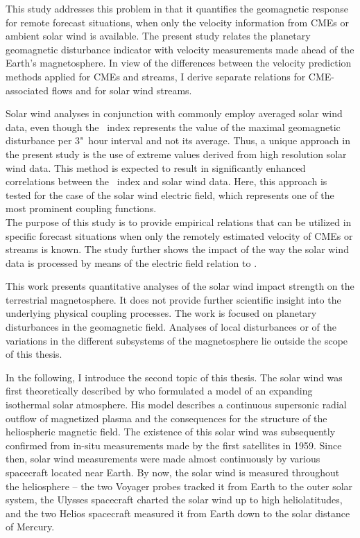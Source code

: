 This study addresses this problem in that it quantifies the geomagnetic response for remote forecast situations, when only the velocity information from CMEs or ambient solar wind is available.
The present study relates the planetary geomagnetic disturbance indicator \Kp{} with velocity measurements made ahead of the Earth's magnetosphere. In view of the differences between the velocity prediction methods applied for CMEs and streams, I derive separate relations for CME-associated flows and for solar wind streams.

Solar wind analyses in conjunction with \Kp{} commonly employ averaged solar wind data, even though the \Kp~index represents the value of the maximal geomagnetic disturbance per 3"~hour interval and not its average. Thus, a unique approach in the present study is the use of extreme values derived from high resolution solar wind data. This method is expected to result in significantly enhanced correlations between the \Kp~index and solar wind data. Here, this approach is tested for the case of the solar wind electric field, which represents one of the most prominent coupling functions.\\

The purpose of this study is to provide empirical \Kp{} relations that can be utilized in specific forecast situations when only the remotely estimated velocity of CMEs or streams is known.
The study further shows the impact of the way the solar wind data is processed by means of the electric field relation to \Kp{}.

This work presents quantitative analyses of the solar wind impact strength on the terrestrial magnetosphere. It does not provide further scientific insight into the underlying physical coupling processes.
The work is focused on planetary disturbances in the geomagnetic field. Analyses of local disturbances or of the variations in the different subsystems of the magnetosphere lie outside the scope of this thesis.

\bigskip

In the following, I introduce the second topic of this thesis.
The solar wind was first theoretically described by \citet{Parker1958} who formulated a model of an expanding isothermal solar atmosphere. His model describes a continuous supersonic radial outflow of magnetized plasma and the consequences for the structure of the heliospheric magnetic field. The existence of this solar wind was subsequently confirmed from in-situ measurements made by the first satellites in 1959. Since then, solar wind measurements were made almost continuously by various spacecraft located near Earth. By now, the solar wind is measured throughout the heliosphere -- the two Voyager probes tracked it from Earth to the outer solar system, the Ulysses spacecraft charted the solar wind up to high heliolatitudes, and the two Helios spacecraft measured it from Earth down to the solar distance of Mercury.\\


